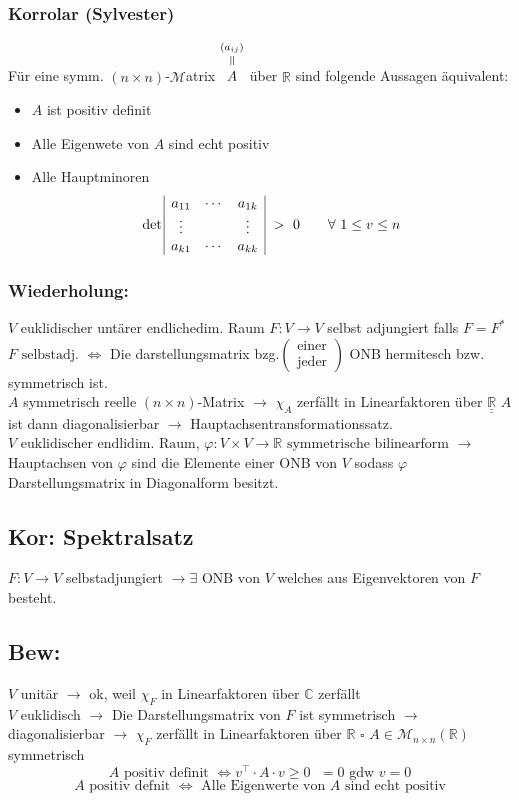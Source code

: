 \documentclass[titlepage,12pt,a4paper,ngerman]{report}
\newenvironment{bew}{\subsection{Bew:}}{\hfill$\square$}
\newcommand{\Bew}[1]{\begin{bew}#1\end{bew}}
\newcommand{\verteq}{\rotatebox{90}{$\,=$}}
\newcommand{\equaltoup}[2]{\overset{\scriptstyle\underset{\mkern4mu\verteq}{#2}}{#1}}
\newcommand{\tx}[1]{\textrm{#1}}
\begin{document}
\subsubsection{Korrolar (Sylvester)}
Für eine symm. $(n \times n)$-$\mathcal M$atrix $\equaltoup{A}{(a_{ij})}$ über $\mathbb R$ sind folgende Aussagen äquivalent:
\begin{itemize}
	\item $A$ ist positiv definit
	\item Alle Eigenwete von $A$ sind echt positiv
	\item Alle Hauptminoren
	$$\det \begin{array}{| ccc |}
	a_{11} & \cdots & a_{1k}\\
	\vdots & & \vdots\\
	a_{k1} & \cdots & a_{kk}	
	\end{array} \ > \ 0 \qquad \forall\  1 \le v \le n$$
\end{itemize}



\subsubsection{Wiederholung:}
$V$ euklidischer untärer endlichedim. Raum $F: V \to V$ selbst adjungiert falls $F = F^*$\\ 
$F \tx{ selbstadj. } \Leftrightarrow$ Die darstellungsmatrix bzg.$\begin{pmatrix}
\tx{einer} \\ \tx{jeder}
\end{pmatrix}$ ONB hermitesch bzw. symmetrisch ist.\\
$A$ symmetrisch reelle $(n \times n)$-Matrix $\rightarrow$ $\chi_A$ zerfällt in Linearfaktoren über $\underline{\underline{\mathbb R}}$
$A$ ist dann diagonalisierbar $\rightarrow$ Hauptachsentransformationssatz.\\ 
$V \tx{ euklidischer endlidim. Raum}$, $\varphi: V \times V \to \mathbb R \tx{ symmetrische bilinearform}$
$\rightarrow$ Hauptachsen von $\varphi$ sind die Elemente einer ONB von $V$ sodass $\varphi$ Darstellungsmatrix in Diagonalform besitzt.
\subsection{Kor: Spektralsatz}
$F:V\to V$ selbstadjungiert $\rightarrow \exists \tx{ ONB von } V$ welches aus Eigenvektoren von $F$ besteht.
\Bew{$V$ unitär $\rightarrow$ ok, weil $\chi_F$ in Linearfaktoren über $\mathbb C$ zerfällt\\
	$V$ euklidisch $\rightarrow$ Die Darstellungsmatrix von $F$ ist symmetrisch $\rightarrow$ diagonalisierbar $\rightarrow$ $\chi_F$ zerfällt in Linearfaktoren über $\mathbb R$ 
}
$ A \in \mathcal{M}_{n \times n} (\mathbb{R}) $ symmetrisch
$$ A \tx{ positiv definit } \Leftrightarrow v^\top \cdot A \cdot v \ge 0 \, \ \ = 0 \tx{ gdw } v = 0$$
$$ A \tx{ positiv defnit } \Leftrightarrow \tx{ Alle Eigenwerte von } A \tx{ sind echt positiv}$$
\end{document}
